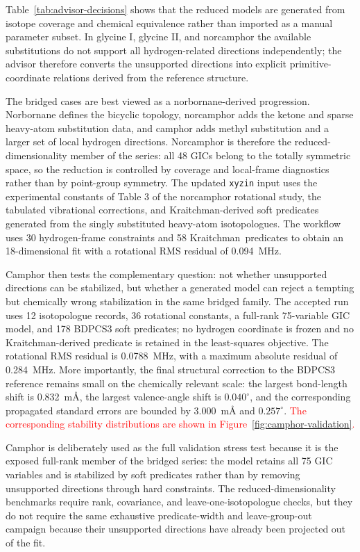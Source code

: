 \documentclass[aip,jcp,reprint,longbibliography,floatfix]{revtex4-2}
\newcommand{\rev}[1]{\textcolor{red}{#1}}
\begin{document}
Table~\ref{tab:advisor-decisions} shows that the reduced models are generated
from isotope coverage and chemical equivalence rather than imported as a
manual parameter subset. In glycine I, glycine II, and norcamphor the available
substitutions do not support all hydrogen-related directions independently;
the advisor therefore converts the unsupported directions into explicit
primitive-coordinate relations derived from the reference structure.

The bridged cases are best viewed as a norbornane-derived progression.
Norbornane defines the bicyclic topology, norcamphor adds the ketone and
sparse heavy-atom substitution data, and camphor adds methyl substitution and
a larger set of local hydrogen directions. Norcamphor is therefore the
reduced-dimensionality member of the series: all 48 GICs belong to the
totally symmetric space, so the reduction is controlled by coverage and
local-frame diagnostics rather than by point-group symmetry. The updated
\texttt{xyzin} input uses the experimental constants of Table 3 of the
norcamphor rotational study, the tabulated vibrational corrections, and
Kraitchman-derived soft predicates generated from the singly substituted
heavy-atom isotopologues. The workflow uses 30 hydrogen-frame constraints and
58 \mbox{Kraitchman predicates} to obtain an 18-dimensional fit with a
rotational RMS residual of 0.094~MHz.

Camphor then tests the complementary question: not whether unsupported
directions can be stabilized, but whether a generated model can reject a
tempting but chemically wrong stabilization in the same bridged family. The
accepted run uses 12 isotopologue records, 36 rotational constants, a
full-rank 75-variable GIC model, and 178 BDPCS3 soft predicates; no hydrogen
coordinate is frozen and no Kraitchman-derived predicate is retained in the
least-squares objective. The rotational RMS residual is 0.0788~MHz, with a
maximum absolute residual of 0.284~MHz. More importantly, the final structural
correction to the BDPCS3 reference remains small on the chemically relevant
scale: the largest bond-length shift is 0.832~m\AA{}, the largest
valence-angle shift is $0.040^\circ$, and the corresponding propagated
standard errors are bounded by 3.000~m\AA{} and $0.257^\circ$. \rev{The
corresponding stability distributions are shown in
Figure~\ref{fig:camphor-validation}.}

Camphor is deliberately used as the full validation stress test because it is
the exposed full-rank member of the bridged series: the model retains all 75
GIC variables and is stabilized by soft predicates rather than by removing
unsupported directions through hard constraints. The reduced-dimensionality
benchmarks require rank, covariance, and leave-one-isotopologue checks, but
they do not require the same exhaustive predicate-width and leave-group-out
campaign because their unsupported directions have already been projected out
of the fit.
\end{document}

